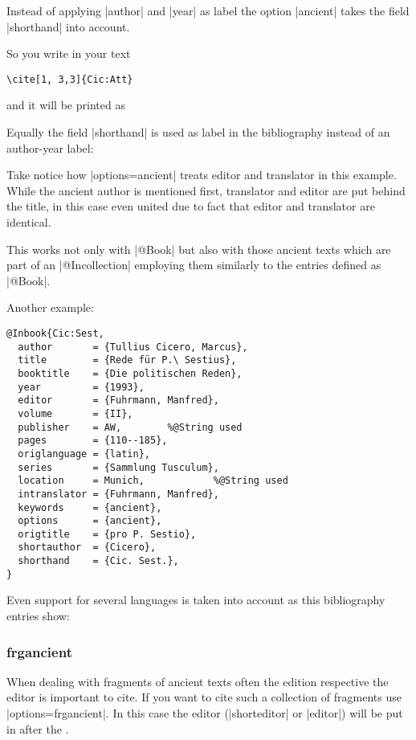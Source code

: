 \documentclass[a4paper,
10pt,
greek,
french,
spanish,
italian,
ngerman,
english
]{ltxdoc}
\begin{document}
Instead of applying |author| and |year| as label the option |ancient| takes the field |shorthand| into account.

So you write in your text
\begin{lstlisting}
\cite[1, 3,3]{Cic:Att}\end{lstlisting} 

and it will be printed as

\begin{refsection}
\begin{bsp}
\cite[1, 3,3]{Cic:Att}
\end{bsp}\end{refsection}

Equally the field |shorthand| is used as label in the bibliography instead of an author-year label:

Take notice how |options={ancient}| treats editor and translator in this example. 
While the ancient author is mentioned first, translator and editor are put behind the title, 
in this case even united due to fact that editor and translator are identical.

This works not only with |@Book| but also with those ancient texts which are part of an |@Incollection| employing them similarly to the entries defined as |@Book|.

Another example:
\begin{lstlisting}[style=bibentry,label=Cic:Sest,caption={{@}Inbook\{Cic:Sest,…\} }]
@Inbook{Cic:Sest,
  author       = {Tullius Cicero, Marcus},
  title        = {Rede für P.\ Sestius},
  booktitle    = {Die politischen Reden},
  year         = {1993},
  editor       = {Fuhrmann, Manfred},
  volume       = {II},
  publisher    = AW,		%@String used
  pages        = {110--185},
  origlanguage = {latin},
  series       = {Sammlung Tusculum},
  location     = Munich,			%@String used
  intranslator = {Fuhrmann, Manfred},
  keywords     = {ancient},
  options      = {ancient},
  origtitle    = {pro P. Sestio},
  shortauthor  = {Cicero},
  shorthand    = {Cic. Sest.},
}
\end{lstlisting}

Even support for several languages is taken into account as this bibliography entries show: 

\subsubsection{frgancient}\label{frgancient}
When dealing with fragments of ancient texts often the edition respective the editor is important to cite. 
If you want to cite such a collection of fragments use |options={frgancient}|.
In this case the editor (|shorteditor| or |editor|) will be put in after the . 
\end{document}
